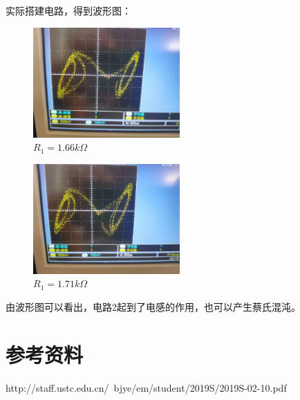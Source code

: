 \documentclass[UTF8]{ctexart}
\begin{document}
实际搭建电路，得到波形图：

\begin{figure}[H]
        \centering
        \includegraphics*[width = 0.5\textwidth]{2-2-1-r.jpg}
        \caption{$R_1 = 1.66k\Omega$}
\end{figure}
\begin{figure}[H]
        \centering
        \includegraphics*[width = 0.5\textwidth]{2-2-2-r.jpg}
        \caption{$R_1 = 1.71k\Omega$}
\end{figure}

由波形图可以看出，电路2起到了电感的作用，也可以产生蔡氏混沌。

\section*{参考资料}

http://staff.ustc.edu.cn/~bjye/em/student/2019S/2019S-02-10.pdf
\end{document}
